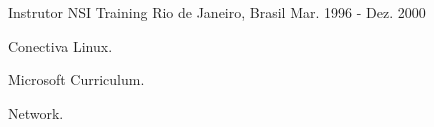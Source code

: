 \begin{cventries}

\cventry
{Instrutor} %
{NSI Training} %
{Rio de Janeiro, Brasil} %
{Mar. 1996 - Dez. 2000} %
{ %
\begin{cvitems}
\item {Conectiva Linux.}
\item {Microsoft Curriculum.}
\item {Network.}
\end{cvitems}
}



\end{cventries}
